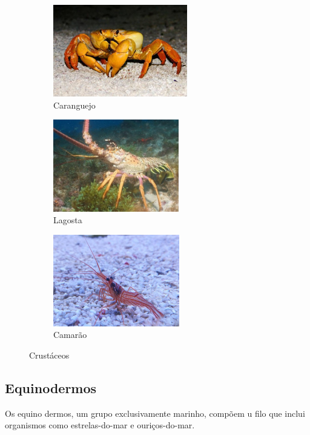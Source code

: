 \documentclass{report}
\begin{document}
\begin{figure}[H]
\center
    \begin{subfigure}{.5\textwidth}
    \center
        \includegraphics[height=4cm]{imagens/caranguejo.jpg}
        \caption{Caranguejo}
        \label{fig:caranguejo}
    \end{subfigure}%
    \hfill
    \begin{subfigure}{.5\textwidth}
    \center
        \includegraphics[height=4cm]{imagens/lagosta.jpg}
        \caption{Lagosta}
        \label{fig:lagosta}
    \end{subfigure}%
    \hfill
    \begin{subfigure}{.5\textwidth}
    \center    
        \includegraphics[height=4cm]{imagens/camarao.jpg}
        \caption{Camarão}
        \label{fig:camarao}
    \end{subfigure}
    \caption{Crustáceos}
    \label{fig:crustaceos}
\end{figure}

\subsection{Equinodermos}
Os equino dermos, um grupo exclusivamente marinho, compõem u  filo que inclui organismos como estrelas-do-mar e ouriços-do-mar.
\end{document}
